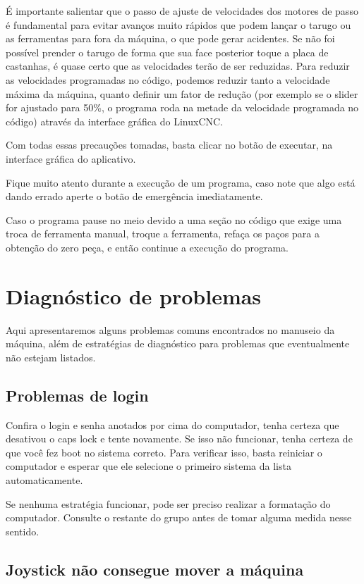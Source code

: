 \documentclass[twoside,a4paper]{refart}
\begin{document}
É importante salientar que o passo de ajuste de velocidades dos motores de passo é fundamental para evitar avanços muito rápidos que podem lançar o tarugo ou as ferramentas para fora da máquina, o que pode gerar acidentes. Se não foi possível prender o tarugo de forma que sua face posterior toque a placa de castanhas, é quase certo que as velocidades terão de ser reduzidas. Para reduzir as velocidades programadas no código, podemos reduzir tanto a velocidade máxima da máquina, quanto definir um fator de redução (por exemplo se o slider for ajustado para 50\%, o programa roda na metade da velocidade programada no código) através da interface gráfica do LinuxCNC.

Com todas essas precauções tomadas, basta clicar no botão de executar, na interface gráfica do aplicativo. 

\attention Fique muito atento durante a execução de um programa, caso note que algo está dando errado aperte o botão de emergência imediatamente.

\attention Caso o programa pause no meio devido a uma seção no código que exige uma troca de ferramenta manual, troque a ferramenta, refaça os paços para a obtenção do zero peça, e então continue a execução do programa.  

\section{Diagnóstico de problemas}

Aqui apresentaremos alguns problemas comuns encontrados no manuseio da máquina, além de estratégias de diagnóstico para problemas que eventualmente não estejam listados.

\subsection{Problemas de login}

Confira o login e senha anotados por cima do computador, tenha certeza que desativou o caps lock e tente novamente. Se isso não funcionar, tenha certeza de que você fez boot no sistema correto. Para verificar isso, basta reiniciar o computador e esperar que ele selecione o primeiro sistema da lista automaticamente. 

Se nenhuma estratégia funcionar, pode ser preciso realizar a formatação do computador. Consulte o restante do grupo antes de tomar alguma medida nesse sentido.

\subsection{Joystick não consegue mover a máquina}
\end{document}

